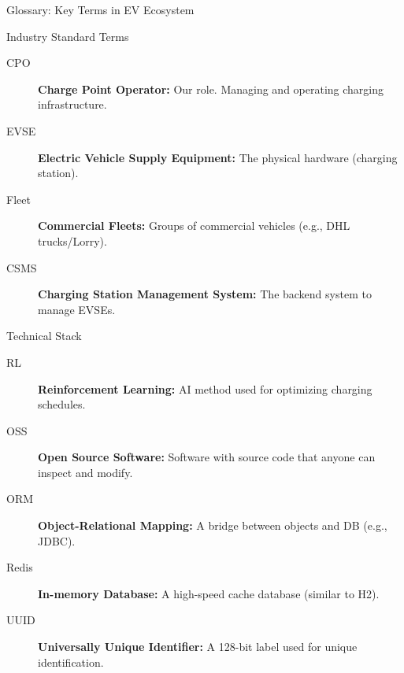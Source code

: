 \documentclass[11pt]{beamer}
\begin{document}
\begin{frame}[allowframebreaks]{Glossary: Key Terms in EV Ecosystem}
    
    \begin{block}{Industry Standard Terms}
        \begin{description}
            \item[CPO] \textbf{Charge Point Operator:} Our role. Managing and operating charging infrastructure.
            \item[EVSE] \textbf{Electric Vehicle Supply Equipment:} The physical hardware (charging station).
            \item[Fleet] \textbf{Commercial Fleets:} Groups of commercial vehicles (e.g., DHL trucks/Lorry).
            \item[CSMS] \textbf{Charging Station Management System:} The backend system to manage EVSEs.
        \end{description}
    \end{block}

    \framebreak

    \begin{block}{Technical Stack}
        \begin{description}
            \item[RL] \textbf{Reinforcement Learning:} AI method used for optimizing charging schedules.
            \item[OSS] \textbf{Open Source Software:} Software with source code that anyone can inspect and modify.
            \item[ORM] \textbf{Object-Relational Mapping:} A bridge between objects and DB (e.g., JDBC).
            \item[Redis] \textbf{In-memory Database:} A high-speed cache database (similar to H2).
            \item[UUID] \textbf{Universally Unique Identifier:} A 128-bit label used for unique identification.
        \end{description}
    \end{block}

\end{frame}
\end{document}
